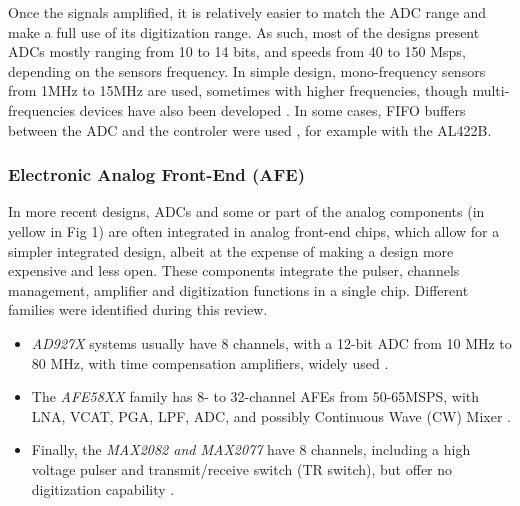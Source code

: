\documentclass{article}
\begin{document}
Once the signals amplified, it is relatively easier to match the ADC range and make a full use of its digitization range. As such, most of the designs present ADCs mostly ranging from 10 to 14 bits, and speeds from 40 to 150 Msps, depending on the sensors frequency. In simple design, mono-frequency sensors from 1MHz to 15MHz are used, sometimes with higher frequencies, though multi-frequencies \cite{sun_multi-frequency_2018} devices have also been developed \cite{lukacs_single-element_1998,foster_new_2009}. In some cases, FIFO buffers between the ADC and the controler were used \cite{yang_compressed_2009}, for example with the AL422B. 

\subsubsection{Electronic Analog Front-End (AFE)}

In more recent designs, ADCs and some or part of the analog components (in yellow in Fig 1) are often integrated in analog front-end chips, which allow for a simpler integrated design, albeit at the expense of making a design more expensive and less open. These components integrate the pulser, channels management, amplifier and digitization functions in a single chip. Different families were identified during this review. 

\begin{itemize}
\item \emph{AD927X} systems usually have 8 channels, with a 12-bit ADC from 10 MHz to 80 MHz, with time compensation amplifiers, widely used \cite{di_ianni_system-level_2016,hewener_highly_2012,  raj_programmable_2018, cheung_multi-channel_2012, alqasemi_fpga-based_2012, batbayar_hardware_2018,  techavipoo_ultrasound_2012}. 
\item The \emph{AFE58XX} family has 8- to 32-channel AFEs from 50-65MSPS, with LNA, VCAT, PGA, LPF, ADC, and possibly Continuous Wave (CW) Mixer \cite{assef_flexible_2015, assef_design_2012, assef_compact_2014, assef_initial_2016, bharath_fpga-based_2015, bharath_novel_2016, lee_new_2014, hager_lightprobe:_2017, bharath_compact_2018, kidav_architecture_2019}.
\item Finally, the \emph{MAX2082 and MAX2077} have 8 channels, including a high voltage pulser and transmit/receive switch (TR switch), but offer no digitization capability \cite{hewener_mobile_2019, weng_fpga-based_2015,seo_non-invasive_2018,sabbella_dhvani_2021}.

\end{itemize}
\end{document}
